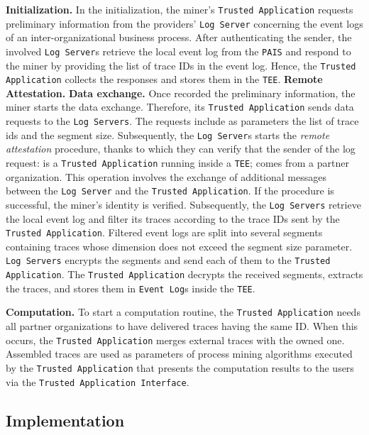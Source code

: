 \textbf{Initialization.} In the initialization, the miner's \texttt{Trusted Application} requests preliminary information from the providers' \texttt{Log Server} concerning the event logs of an inter-organizational business process. After authenticating the sender, the involved \texttt{Log Server}s retrieve the local event log from the \texttt{PAIS} and respond to the miner by providing the list of trace IDs in the event log. Hence, the \texttt{Trusted Application} collects the responses and stores them in the \texttt{TEE}.
\textbf{Remote Attestation.} 
\textbf{Data exchange.} Once recorded the preliminary information, the miner starts the data exchange. Therefore, its \texttt{Trusted Application} sends data requests to the \texttt{Log Servers}. The requests include as parameters the list of trace ids and the segment size. Subsequently, the \texttt{Log Server}s starts the \textit{remote attestation} procedure, thanks to which they can verify that the sender of the log request: is a \texttt{Trusted Application} running inside a \texttt{TEE}; comes from a partner organization. This operation involves the exchange of additional messages between the \texttt{Log Server} and the \texttt{Trusted Application}. If the procedure is successful, the miner's identity is verified.
Subsequently, the \texttt{Log Servers} retrieve the local event log and filter its traces according to the trace IDs sent by the \texttt{Trusted Application}. Filtered event logs are split into several segments containing traces whose dimension does not exceed the segment size parameter. \texttt{Log Servers} encrypts the segments and send each of them to the \texttt{Trusted Application}. The \texttt{Trusted Application} decrypts the received segments, extracts the traces, and stores them in \texttt{Event Log}s inside the \texttt{TEE}.

\textbf{Computation.} To start a computation routine, the \texttt{Trusted Application} needs all partner organizations to have delivered traces having the same ID. When this occurs, the \texttt{Trusted Application} merges external traces with the owned one. Assembled traces are used as parameters of process mining algorithms executed by the \texttt{Trusted Application} that presents the computation results to the users via the \texttt{Trusted Application Interface}.







\subsection{Implementation}
\label{sec:implementation:details}

